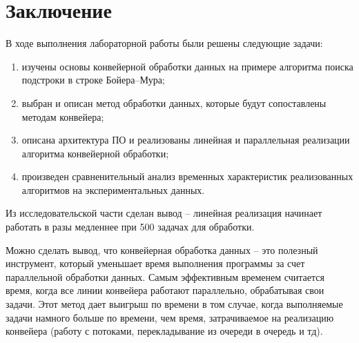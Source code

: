 \chapter*{Заключение}

В ходе выполнения лабораторной работы были решены следующие задачи:

\begin{enumerate}[label = [{*)}]
	\item изучены основы конвейерной обработки данных на примере алгоритма поиска подстроки в строке Бойера--Мура;
	\item выбран и описан метод обработки данных, которые будут сопоставлены методам конвейера;
	\item описана архитектура ПО и реализованы линейная и параллельная реализации алгоритма конвейерной обработки;
	\item произведен сравненительный анализ временных характеристик реализованных алгоритмов на экспериментальных данных.
\end{enumerate}

Из исследовательской части сделан вывод -- линейная реализация начинает работать в разы медленнее при 500 задачах для обработки.


Можно сделать вывод, что конвейерная обработка данных -- это полезный инструмент, который уменьшает время выполнения программы за счет параллельной обработки данных. 
Самым эффективным временем считается время, когда все линии конвейера работают параллельно, обрабатывая свои задачи. 
Этот метод дает выигрыш по времени в том случае, когда выполняемые задачи намного больше по времени, чем время, затрачиваемое на реализацию конвейера (работу с потоками, перекладывание из очереди в очередь и тд).
